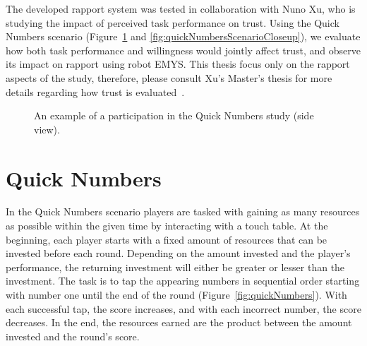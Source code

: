 \label{chap:userstudies}

The developed rapport system was tested in collaboration with Nuno Xu, who is studying the impact of perceived task performance on trust. Using the Quick Numbers scenario (Figure~\ref{fig:quickNumbersScenario} and \ref{fig:quickNumbersScenarioCloseup}), we evaluate how both task performance and willingness would jointly affect trust, and observe its impact on rapport using robot \ac{EMYS}. This thesis focus only on the rapport aspects of the study, therefore, please consult Xu's Master's thesis for more details regarding how trust is evaluated~\cite{Xu2016}.

\begin{figure}[H]
	\centering
	\caption{An example of a participation in the Quick Numbers study (side view).}
	\label{fig:quickNumbersScenario}
\end{figure}

\section{Quick Numbers}
\label{sec:ScenarioDescription}

In the Quick Numbers scenario players are tasked with gaining as many resources as possible within the given time by interacting with a touch table. At the beginning, each player starts with a fixed amount of resources that can be invested before each round. Depending on the amount invested and the player's performance, the returning investment will either be greater or lesser than the investment. The task is to tap the appearing numbers in sequential order starting with number one until the end of the round (Figure~\ref{fig:quickNumbers}). With each successful tap, the score increases, and with each incorrect number, the score decreases. In the end, the resources earned are the product between the amount invested and the round's score.

